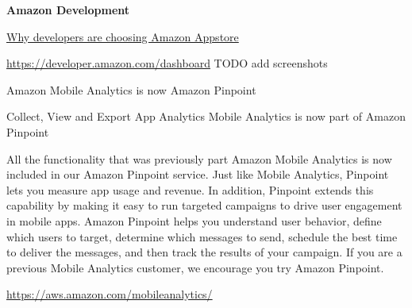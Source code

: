 \textbf{Amazon Development}

\href{https://developer.amazon.com/apps-and-games}{Why developers are choosing Amazon Appstore}

\url{https://developer.amazon.com/dashboard}
TODO add screenshots

Amazon Mobile Analytics is now Amazon Pinpoint

Collect, View and Export App Analytics
Mobile Analytics is now part of Amazon Pinpoint

All the functionality that was previously part Amazon Mobile Analytics is now included in our Amazon Pinpoint service. Just like Mobile Analytics, Pinpoint lets you measure app usage and revenue. In addition, Pinpoint extends this capability by making it easy to run targeted campaigns to drive user engagement in mobile apps. Amazon Pinpoint helps you understand user behavior, define which users to target, determine which messages to send, schedule the best time to deliver the messages, and then track the results of your campaign. If you are a previous Mobile Analytics customer, we encourage you try Amazon Pinpoint.

\url{https://aws.amazon.com/mobileanalytics/}